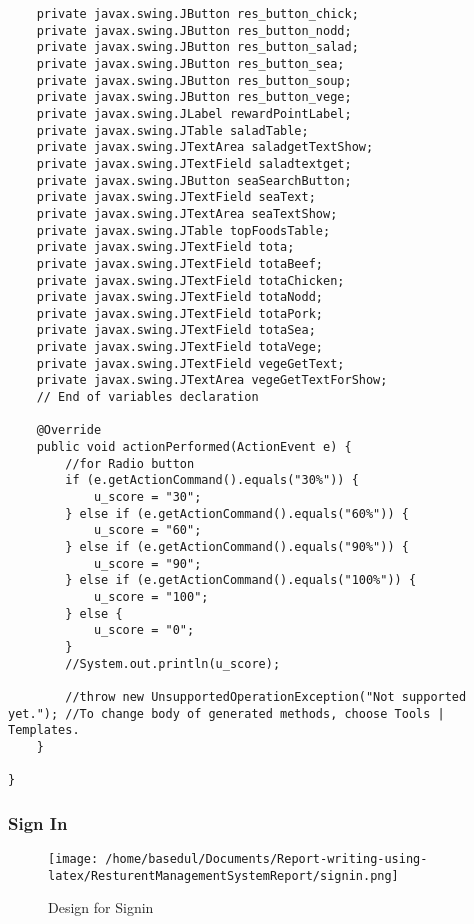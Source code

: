 \documentclass[12pt,a4paper]{article}
\begin{document}
\begin{lstlisting}
    private javax.swing.JButton res_button_chick;
    private javax.swing.JButton res_button_nodd;
    private javax.swing.JButton res_button_salad;
    private javax.swing.JButton res_button_sea;
    private javax.swing.JButton res_button_soup;
    private javax.swing.JButton res_button_vege;
    private javax.swing.JLabel rewardPointLabel;
    private javax.swing.JTable saladTable;
    private javax.swing.JTextArea saladgetTextShow;
    private javax.swing.JTextField saladtextget;
    private javax.swing.JButton seaSearchButton;
    private javax.swing.JTextField seaText;
    private javax.swing.JTextArea seaTextShow;
    private javax.swing.JTable topFoodsTable;
    private javax.swing.JTextField tota;
    private javax.swing.JTextField totaBeef;
    private javax.swing.JTextField totaChicken;
    private javax.swing.JTextField totaNodd;
    private javax.swing.JTextField totaPork;
    private javax.swing.JTextField totaSea;
    private javax.swing.JTextField totaVege;
    private javax.swing.JTextField vegeGetText;
    private javax.swing.JTextArea vegeGetTextForShow;
    // End of variables declaration                   

    @Override
    public void actionPerformed(ActionEvent e) {
        //for Radio button
        if (e.getActionCommand().equals("30%")) {
            u_score = "30";
        } else if (e.getActionCommand().equals("60%")) {
            u_score = "60";
        } else if (e.getActionCommand().equals("90%")) {
            u_score = "90";
        } else if (e.getActionCommand().equals("100%")) {
            u_score = "100";
        } else {
            u_score = "0";
        }
        //System.out.println(u_score);

        //throw new UnsupportedOperationException("Not supported yet."); //To change body of generated methods, choose Tools | Templates.
    }

}

	\end{lstlisting}	
	
	
	\subsubsection{Sign In}
		\begin{figure}[H]
		\centering
		\texttt{[image: /home/basedul/Documents/Report-writing-using-latex/ResturentManagementSystemReport/signin.png]}
		\caption{Design for Signin}
		\label{fig:signout} 
\end{figure}
\end{document}
